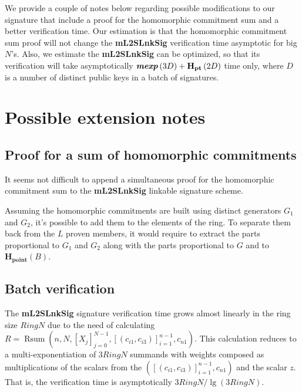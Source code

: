 \documentclass{mathcryptology} %
\DeclareMathOperator{\Rsum}{Rsum}
\newcommand{\RingN}{\textit{RingN}}
\newcommand{\Hpoint}{\textbf{H}_{\textbf{point}}}
\newcommand{\Hpt}{\textbf{H}_{\textbf{pt}}}
\newcommand{\mexp}{\textbf{\textit{mexp}}}
\theoremstyle{title}
\theoremstyle{titleof}
\begin{document}
    We provide a couple of notes below regarding possible modifications to our signature that include a proof for the homomorphic commitment sum and a better verification time. Our estimation is that the homomorphic commitment sum proof will not change the \textbf{mL2SLnkSig} verification time asymptotic for big $N$'s. Also, we estimate the \textbf{mL2SLnkSig} can be optimized, so that its verification will take asymptotically $\mexp\left(3D\right)+\Hpt\left(2D\right)$ time only, where $D$ is a number of distinct public keys in a batch of signatures.


\section{Possible extension notes}


\subsection{Proof for a sum of homomorphic commitments}
    It seems not difficult to append a simultaneous proof for the homomorphic commitment sum to the \textbf{mL2SLnkSig} linkable signature scheme.

    Assuming the homomorphic commitments are built using distinct generators $G_{1}$ and $G_{2}$, it's possible to add them to the elements of the ring. To separate them back from the $L$ proven members, it would require to extract the parts proportional to $G_{1}$ and $G_{2}$ along with the parts proportional to $G$ and to $\Hpoint\left(B\right)$.


\subsection{Batch verification}
    The \textbf{mL2SLnkSig} signature verification time grows almost linearly in the ring size $\RingN$ due to the need of calculating $R=\Rsum\left(n, N, {\left[X_{j}\right]}_{j=0}^{N-1}, {\left[\left(c_{i1}, c_{i3}\right)\right]}_{i=1}^{n-1}, c_{n1}\right)$. This calculation reduces to a multi-exponentiation of $3\RingN$ summands with weights composed as multiplications of the scalars from the $({\left[\left(c_{i1}, c_{i3}\right)\right]}_{i=1}^{n-1}, c_{n1})$ and the scalar $z$. That is, the verification time is asymptotically $3\RingN/\lg\left(3\RingN\right)$.
\end{document}
